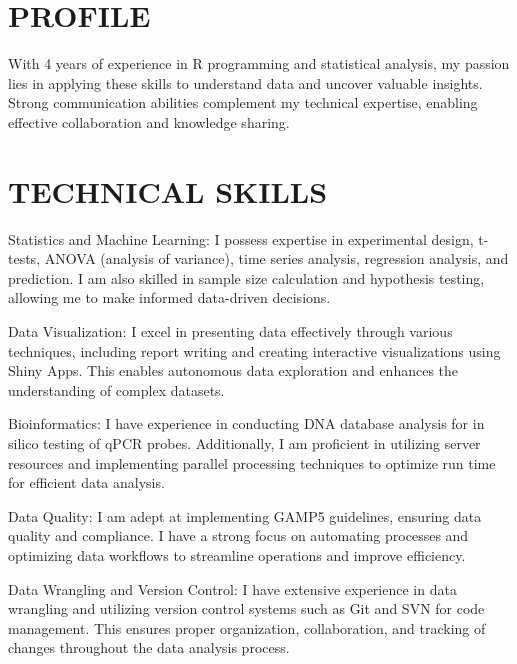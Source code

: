 \documentclass[]{plushcv}
\begin{document}
\begin{minipage}[t]{0.70\textwidth} 
\sectionsep
\section{PROFILE}
With 4 years of experience in R programming and statistical analysis, my passion lies in applying these skills to understand data and uncover valuable insights. Strong communication abilities complement my technical expertise, enabling effective collaboration and knowledge sharing.

\sectionsep
\sectionsep

\section{TECHNICAL SKILLS}
\begin{tightemize}
\sectionsep
\item Statistics and Machine Learning: I possess expertise in experimental design, t-tests, ANOVA (analysis of variance), time series analysis, regression analysis, and prediction. I am also skilled in sample size calculation and hypothesis testing, allowing me to make informed data-driven decisions.
\item Data Visualization: I excel in presenting data effectively through various techniques, including report writing and creating interactive visualizations using Shiny Apps. This enables autonomous data exploration and enhances the understanding of complex datasets.
\item Bioinformatics: I have experience in conducting DNA database analysis for in silico testing of qPCR probes. Additionally, I am proficient in utilizing server resources and implementing parallel processing techniques to optimize run time for efficient data analysis.
\item Data Quality: I am adept at implementing GAMP5 guidelines, ensuring data quality and compliance. I have a strong focus on automating processes and optimizing data workflows to streamline operations and improve efficiency.
\item Data Wrangling and Version Control: I have extensive experience in data wrangling and utilizing version control systems such as Git and SVN for code management. This ensures proper organization, collaboration, and tracking of changes throughout the data analysis process.
\end{tightemize}

\sectionsep
\sectionsep



\end{minipage}
\end{document}

